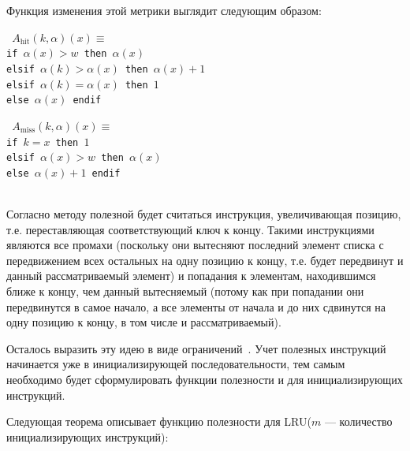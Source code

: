 \documentclass[14pt]{extreport}
\newcommand{\LRU}{\textsf{LRU}\xspace}
\begin{document}
Функция изменения этой метрики выглядит следующим образом:\\

\parbox{0.5\textwidth}{ \tt
$A_{\mbox{hit}}(k, \alpha)(x) \equiv$\\
if $\alpha(x) > w$ then $\alpha(x)$\\
elsif $\alpha(k) > \alpha(x)$ then $\alpha(x)+1$\\
elsif $\alpha(k) = \alpha(x)$ then $1$\\
else $\alpha(x)$ endif%
}\parbox{0.5\textwidth}{\tt
$A_{\mbox{miss}}(k, \alpha)(x) \equiv$\\
if $k = x$ then $1$\\
elsif $\alpha(x) > w$ then $\alpha(x)$\\
else $\alpha(x) + 1$ endif}\\

Согласно методу полезной будет считаться инструкция, увеличивающая позицию, т.е.
переставляющая соответствующий ключ к концу. Такими инструкциями являются все
промахи (поскольку они
вытесняют последний элемент списка с передвижением всех остальных на одну
позицию к концу, т.е. будет передвинут и данный рассматриваемый элемент) и
попадания к элементам, находившимся ближе к концу, чем данный вытесняемый
(потому как при попадании они
передвинутся в самое начало, а все элементы от начала и до них сдвинутся на одну
позицию к концу, в том числе и рассматриваемый).

Осталось выразить эту идею в виде ограничений~\cite{my_ewdts_2009}.
Учет полезных инструкций начинается уже в инициализирующей последовательности,
тем самым необходимо будет сформулировать функции полезности и для
инициализирующих инструкций.

Следующая теорема описывает функцию полезности для \LRU ($m$ --- количество
инициализирующих инструкций):
\end{document}
